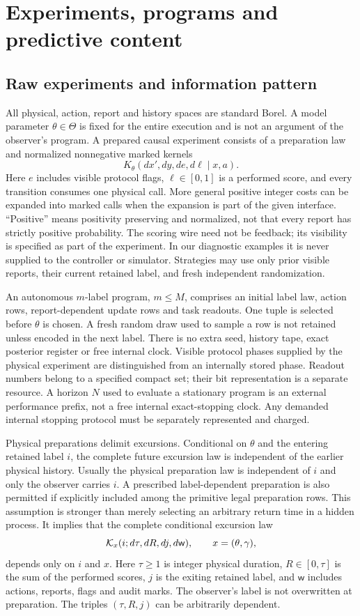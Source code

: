\section{Experiments, programs and predictive content}
\subsection{Raw experiments and information pattern}
All physical, action, report and history spaces are standard Borel. A model parameter $\theta\in\Theta$ is fixed for the entire execution and is not an argument of the observer's program. A prepared causal experiment consists of a preparation law and normalized nonnegative marked kernels
\[
 K_\theta(dx',dy,de,d\ell\mid x,a).
\]
Here $e$ includes visible protocol flags, $\ell\in[0,1]$ is a performed score, and every transition consumes one physical call. More general positive integer costs can be expanded into marked calls when the expansion is part of the given interface. ``Positive'' means positivity preserving and normalized, not that every report has strictly positive probability. The scoring wire need not be feedback; its visibility is specified as part of the experiment. In our diagnostic examples it is never supplied to the controller or simulator. Strategies may use only prior visible reports, their current retained label, and fresh independent randomization.

An autonomous $m$-label program, $m\le M$, comprises an initial label law, action rows, report-dependent update rows and task readouts. One tuple is selected before $\theta$ is chosen. A fresh random draw used to sample a row is not retained unless encoded in the next label. There is no extra seed, history tape, exact posterior register or free internal clock. Visible protocol phases supplied by the physical experiment are distinguished from an internally stored phase. Readout numbers belong to a specified compact set; their bit representation is a separate resource. A horizon $N$ used to evaluate a stationary program is an external performance prefix, not a free internal exact-stopping clock. Any demanded internal stopping protocol must be separately represented and charged.

Physical preparations delimit excursions. Conditional on $\theta$ and the entering retained label $i$, the complete future excursion law is independent of the earlier physical history. Usually the physical preparation law is independent of $i$ and only the observer carries $i$. A prescribed label-dependent preparation is also permitted if explicitly included among the primitive legal preparation rows. This assumption is stronger than merely selecting an arbitrary return time in a hidden process. It implies that the complete conditional excursion law
\[
 \mathcal K_x(i;d\tau,dR,dj,d\mathsf w),\qquad x=(\theta,\gamma),
\]
depends only on $i$ and $x$. Here $\tau\ge1$ is integer physical duration, $R\in[0,\tau]$ is the sum of the performed scores, $j$ is the exiting retained label, and $\mathsf w$ includes actions, reports, flags and audit marks. The observer's label is not overwritten at preparation. The triples $(\tau,R,j)$ can be arbitrarily dependent.

